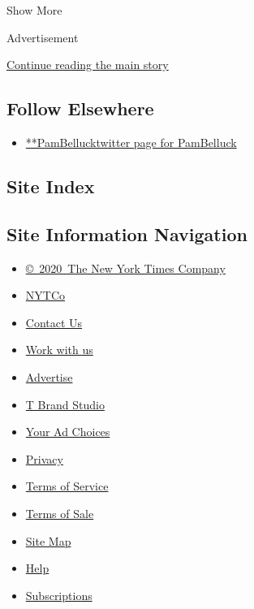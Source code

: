 Show More

Advertisement

\protect\hyperlink{after-mid2}{Continue reading the main story}

\hypertarget{follow-elsewhere}{%
\subsection{Follow Elsewhere}\label{follow-elsewhere}}

\begin{itemize}
\tightlist
\item
  \href{https://twitter.com/PamBelluck}{**PamBellucktwitter page for
  PamBelluck}
\end{itemize}

\hypertarget{site-index}{%
\subsection{Site Index}\label{site-index}}

\hypertarget{site-information-navigation}{%
\subsection{Site Information
Navigation}\label{site-information-navigation}}

\begin{itemize}
\tightlist
\item
  \href{https://help.nytimes3xbfgragh.onion/hc/en-us/articles/115014792127-Copyright-notice}{©~2020~The
  New York Times Company}
\end{itemize}

\begin{itemize}
\tightlist
\item
  \href{https://www.nytco.com/}{NYTCo}
\item
  \href{https://help.nytimes3xbfgragh.onion/hc/en-us/articles/115015385887-Contact-Us}{Contact
  Us}
\item
  \href{https://www.nytco.com/careers/}{Work with us}
\item
  \href{https://nytmediakit.com/}{Advertise}
\item
  \href{http://www.tbrandstudio.com/}{T Brand Studio}
\item
  \href{https://www.nytimes3xbfgragh.onion/privacy/cookie-policy\#how-do-i-manage-trackers}{Your
  Ad Choices}
\item
  \href{https://www.nytimes3xbfgragh.onion/privacy}{Privacy}
\item
  \href{https://help.nytimes3xbfgragh.onion/hc/en-us/articles/115014893428-Terms-of-service}{Terms
  of Service}
\item
  \href{https://help.nytimes3xbfgragh.onion/hc/en-us/articles/115014893968-Terms-of-sale}{Terms
  of Sale}
\item
  \href{https://spiderbites.nytimes3xbfgragh.onion}{Site Map}
\item
  \href{https://help.nytimes3xbfgragh.onion/hc/en-us}{Help}
\item
  \href{https://www.nytimes3xbfgragh.onion/subscription?campaignId=37WXW}{Subscriptions}
\end{itemize}
